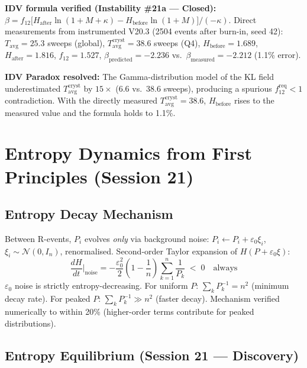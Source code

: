 \documentclass[12pt, a4paper]{article}
\begin{document}
\textbf{IDV formula verified (Instability \#21a --- Closed):}
$\beta = f_{12}\bigl[H_{\mathrm{after}}\ln(1+M+\kappa) - H_{\mathrm{before}}\ln(1+M)\bigr]/(-\kappa)$.
Direct measurements from instrumented V20.3 (2504 events after burn-in, seed 42):
$T_{\mathrm{avg}} = 25.3$ sweeps (global), $T_{\mathrm{avg}}^{\mathrm{cryst}} = 38.6$ sweeps (Q4),
$H_{\mathrm{before}} = 1.689$, $H_{\mathrm{after}} = 1.816$, $f_{12} = 1.527$,
$\beta_{\mathrm{predicted}} = -2.236$ vs.\ $\beta_{\mathrm{measured}} = -2.212$ (1.1\% error).

\textbf{IDV Paradox resolved:} The Gamma-distribution model of the KL field underestimated
$T_{\mathrm{avg}}^{\mathrm{cryst}}$ by $15\times$ (6.6 vs.\ 38.6 sweeps), producing a spurious
$f_{12}^{\mathrm{req}} < 1$ contradiction. With the directly measured $T_{\mathrm{avg}}^{\mathrm{cryst}} = 38.6$,
$H_{\mathrm{before}}$ rises to the measured value and the formula holds to 1.1\%.

\section{Entropy Dynamics from First Principles (Session 21)}

\subsection{Entropy Decay Mechanism}

\begin{derivedbox}[title={$dH/dt$ from $\varepsilon_0$ Noise --- Derived from $\delta$-Chain}]
Between R-events, $P_i$ evolves \emph{only} via background noise:
$P_i \leftarrow P_i + \varepsilon_0\xi_i$, $\xi_i \sim \mathcal{N}(0, I_n)$, renormalised.
Second-order Taylor expansion of $H(P + \varepsilon_0\xi)$:
\[
  \frac{dH}{dt}\bigg|_{\mathrm{noise}}
  = -\frac{\varepsilon_0^2}{2}\!\left(1 - \frac{1}{n}\right)\sum_{k=1}^{n}\frac{1}{P_k}
  \;<\; 0 \quad \text{always}
\]
$\varepsilon_0$ noise is strictly entropy-decreasing. For uniform $P$:
$\sum_k P_k^{-1} = n^2$ (minimum decay rate). For peaked $P$:
$\sum_k P_k^{-1} \gg n^2$ (faster decay). Mechanism verified numerically to within 20\%
(higher-order terms contribute for peaked distributions).
\end{derivedbox}

\subsection{Entropy Equilibrium (Session 21 --- Discovery)}
\end{document}
